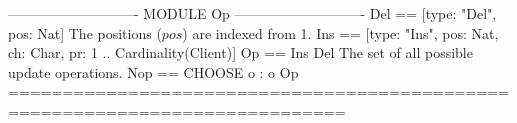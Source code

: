 \documentclass[preview, border={5pt 0pt 5pt 1pt}]{standalone}
\begin{document}
\begin{tla}
---------------------------- MODULE Op ----------------------------
Del == [type: {"Del"}, pos: Nat] \* The positions ($pos$) are indexed from 1.
Ins == [type: {"Ins"}, pos: Nat, ch: Char, pr: 1 .. Cardinality(Client)]
Op == Ins \cup Del \* The set of all possible update operations.
Nop == CHOOSE o : o \notin Op
=============================================================================
\end{tla}
\begin{tlatex}
\@x{}\moduleLeftDash{}\moduleRightDash\@xx{}%
%
%
\@xx{}%
%
%
\@xx{}%
%
\@x{}\bottombar\@xx{}%
\end{tlatex}
\end{document}

